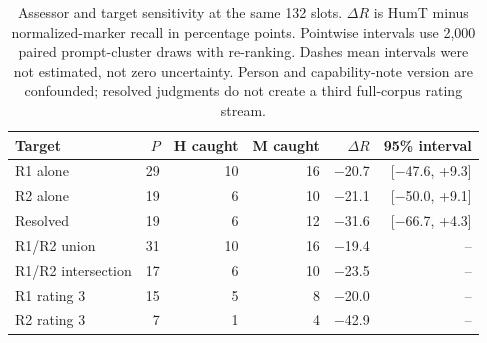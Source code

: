 \begin{table}[htbp]
\centering\small
\caption{Assessor and target sensitivity at the same 132 slots. $\Delta R$ is HumT minus normalized-marker recall in percentage points. Pointwise intervals use 2,000 paired prompt-cluster draws with re-ranking. Dashes mean intervals were not estimated, not zero uncertainty. Person and capability-note version are confounded; resolved judgments do not create a third full-corpus rating stream.}
\label{tab:annotation_sensitivity}
\begin{tabular}{lrrrrr}
\toprule
Target & $P$ & H caught & M caught & $\Delta R$ & 95\% interval \\
\midrule
R1 alone & 29 & 10 & 16 & \ensuremath{-}20.7 & [\ensuremath{-}47.6, +9.3] \\
R2 alone & 19 & 6 & 10 & \ensuremath{-}21.1 & [\ensuremath{-}50.0, +9.1] \\
Resolved & 19 & 6 & 12 & \ensuremath{-}31.6 & [\ensuremath{-}66.7, +4.3] \\
R1/R2 union & 31 & 10 & 16 & \ensuremath{-}19.4 & -- \\
R1/R2 intersection & 17 & 6 & 10 & \ensuremath{-}23.5 & -- \\
R1 rating 3 & 15 & 5 & 8 & \ensuremath{-}20.0 & -- \\
R2 rating 3 & 7 & 1 & 4 & \ensuremath{-}42.9 & -- \\
\bottomrule
\end{tabular}
\end{table}
